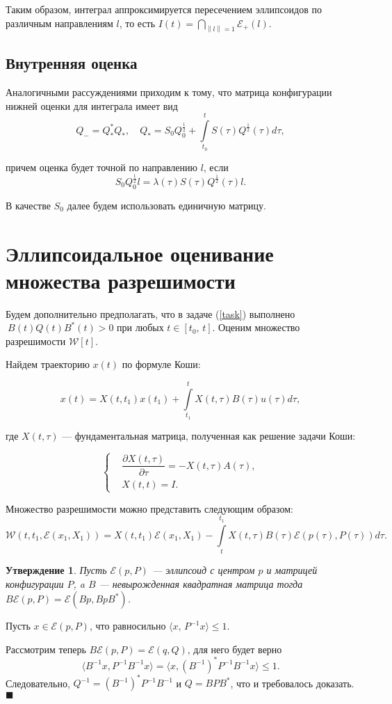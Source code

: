 \documentclass[16pt]{article}
\newtheorem{St}{Утверждение}
\newenvironment{Proof}{\par\noindent{\bf Доказательство. \\}}{\hfill$\scriptstyle\blacksquare$}
\newcommand\Scal[2]{\langle #1,\, #2 \rangle}
\newcommand\Norm[1]{\left\| #1 \right\|}
\newcommand\Int[2]{\int\limits_{#1}^{#2}}
\begin{document}
Таким образом, интеграл аппроксимируется пересечением эллипсоидов по различным направлениям $l$, то есть $I(t) = \bigcap\limits_{\Norm{l} = 1} \mathcal{E}_+(l)$.

\subsection{Внутренняя оценка}
Аналогичными рассуждениями приходим к тому, что матрица конфигурации нижней оценки для интеграла имеет вид
$$Q_- = Q_*^*Q_*, \quad Q_* = S_0Q_0^\frac12 + \Int{t_0}{t}S(\tau)Q^\frac12(\tau)d\tau,$$

причем оценка будет точной по направлению $l$, если 
$$S_0Q_0^\frac12l = \lambda(\tau)S(\tau)Q^\frac12(\tau)l.$$

В качестве $S_0$ далее будем использовать единичную матрицу.

\section{Эллипсоидальное оценивание множества разрешимости}
Будем дополнительно предполагать, что в задаче (\ref{task}) выполнено $\ B(t)Q(t)B^*(t) > 0$ при любых $t \in [t_0,\, t]$. Оценим множество разрешимости $\mathcal{W}[t]$.

Найдем траекторию $x(t)$ по формуле Коши:

$$x(t) = X(t, t_1)x(t_1) + \int\limits_{t_1}^{t} X(t, \tau)B(\tau)u(\tau)d\tau,$$

где $X(t, \tau)$ --- фундаментальная матрица, полученная как решение задачи Коши:

\begin{equation}\label{fund}
\left\{
\begin{aligned}
&\dfrac{\partial X(t, \tau)}{\partial \tau} = -X(t, \tau)A(\tau),\\
&X(t, t) = I.
\end{aligned}
\right.
\end{equation}



Множество разрешимости можно представить следующим образом:
$$
\mathcal{W}(t, t_1, \mathcal{E}(x_1, X_1)) = X(t, t_1)\mathcal{E}(x_1, X_1) - \int\limits_{t}^{t_1}X(t, \tau)B(\tau)\mathcal{E}(p(\tau), P(\tau))d\tau.
$$

\begin{St}
Пусть $\mathcal{E}(p, P)$ --- эллипсоид с центром $p$ и матрицей конфигурации $P$, a $B$ --- невырожденная квадратная матрица тогда $B\mathcal{E}(p, P) = \mathcal{E}(Bp, BpB^*)$.
\end{St}
\begin{Proof}
Пусть $x \in \mathcal{E}(p, P)$, что равносильно $\Scal{x}{P^{-1}x}  \leq 1$.

Рассмотрим теперь $B\mathcal{E}(p, P) = \mathcal{E}(q, Q)$, для него будет верно 
$$\langle B^{-1}x, P^{-1}B^{-1}x\rangle = \langle x, \left(B^{-1}\right)^* P^{-1} B^{-1}x \rangle \leqslant 1.$$
Следовательно, $Q^{-1} = \left(B^{-1}\right)^* P^{-1} B^{-1}$ и $Q = B P B^*$, что и требовалось доказать.
\end{Proof}
\end{document}
